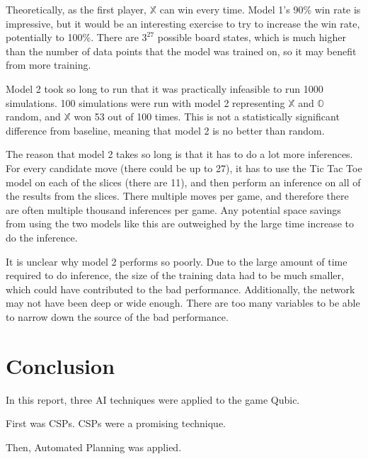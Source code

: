 \documentclass[11pt]{article}
\newcommand{\XX}{$\mathbb{X}$ }
\newcommand{\OO}{$\mathbb{O}$ }
\begin{document}
Theoretically, as the first player, \XX can win every time. Model 1's 90\% win rate is impressive, but it would be an interesting exercise to try to increase the win rate, potentially to 100\%. There are $3^{27}$ possible board states, which is much higher than the number of data points that the model was trained on, so it may benefit from more training.

Model 2 took so long to run that it was practically infeasible to run 1000 simulations. 100 simulations were run with model 2 representing \XX and \OO random, and \XX won 53 out of 100 times. This is not a statistically significant difference from baseline, meaning that model 2 is no better than random.

The reason that model 2 takes so long is that it has to do a lot more inferences. For every candidate move (there could be up to 27), it has to use the Tic Tac Toe model on each of the slices (there are 11), and then perform an inference on all of the results from the slices. There multiple moves per game, and therefore there are often multiple thousand inferences per game. Any potential space savings from using the two models like this are outweighed by the large time increase to do the inference.

It is unclear why model 2 performs so poorly. Due to the large amount of time required to do inference, the size of the training data had to be much smaller, which could have contributed to the bad performance. Additionally, the network may not have been deep or wide enough. There are too many variables to be able to narrow down the source of the bad performance.

\section{Conclusion}
In this report, three AI techniques were applied to the game Qubic. 

First was CSPs. CSPs were a promising technique.

Then, Automated Planning was applied.
\end{document}

